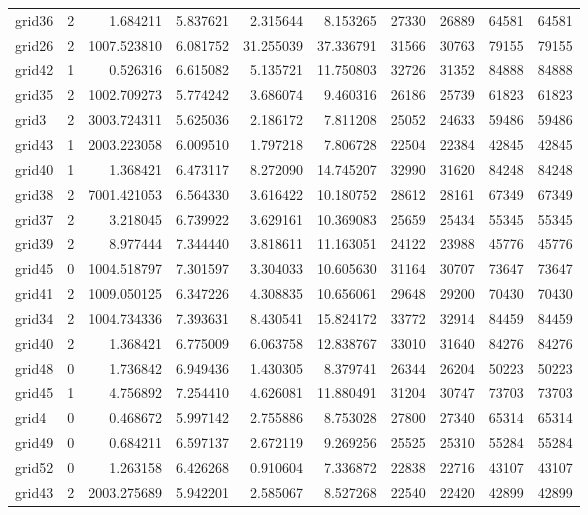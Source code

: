 \begin{longtable}{|l|r|r|r|r|r|r|r|r|r|}
grid36 & 2 & 1.684211 & 5.837621 & 2.315644 & 8.153265 & 27330 & 26889 & 64581 & 64581 \\
grid26 & 2 & 1007.523810 & 6.081752 & 31.255039 & 37.336791 & 31566 & 30763 & 79155 & 79155 \\
grid42 & 1 & 0.526316 & 6.615082 & 5.135721 & 11.750803 & 32726 & 31352 & 84888 & 84888 \\
grid35 & 2 & 1002.709273 & 5.774242 & 3.686074 & 9.460316 & 26186 & 25739 & 61823 & 61823 \\
grid3 & 2 & 3003.724311 & 5.625036 & 2.186172 & 7.811208 & 25052 & 24633 & 59486 & 59486 \\
grid43 & 1 & 2003.223058 & 6.009510 & 1.797218 & 7.806728 & 22504 & 22384 & 42845 & 42845 \\
grid40 & 1 & 1.368421 & 6.473117 & 8.272090 & 14.745207 & 32990 & 31620 & 84248 & 84248 \\
grid38 & 2 & 7001.421053 & 6.564330 & 3.616422 & 10.180752 & 28612 & 28161 & 67349 & 67349 \\
grid37 & 2 & 3.218045 & 6.739922 & 3.629161 & 10.369083 & 25659 & 25434 & 55345 & 55345 \\
grid39 & 2 & 8.977444 & 7.344440 & 3.818611 & 11.163051 & 24122 & 23988 & 45776 & 45776 \\
grid45 & 0 & 1004.518797 & 7.301597 & 3.304033 & 10.605630 & 31164 & 30707 & 73647 & 73647 \\
grid41 & 2 & 1009.050125 & 6.347226 & 4.308835 & 10.656061 & 29648 & 29200 & 70430 & 70430 \\
grid34 & 2 & 1004.734336 & 7.393631 & 8.430541 & 15.824172 & 33772 & 32914 & 84459 & 84459 \\
grid40 & 2 & 1.368421 & 6.775009 & 6.063758 & 12.838767 & 33010 & 31640 & 84276 & 84276 \\
grid48 & 0 & 1.736842 & 6.949436 & 1.430305 & 8.379741 & 26344 & 26204 & 50223 & 50223 \\
grid45 & 1 & 4.756892 & 7.254410 & 4.626081 & 11.880491 & 31204 & 30747 & 73703 & 73703 \\
grid4 & 0 & 0.468672 & 5.997142 & 2.755886 & 8.753028 & 27800 & 27340 & 65314 & 65314 \\
grid49 & 0 & 0.684211 & 6.597137 & 2.672119 & 9.269256 & 25525 & 25310 & 55284 & 55284 \\
grid52 & 0 & 1.263158 & 6.426268 & 0.910604 & 7.336872 & 22838 & 22716 & 43107 & 43107 \\
grid43 & 2 & 2003.275689 & 5.942201 & 2.585067 & 8.527268 & 22540 & 22420 & 42899 & 42899 \\

\end{longtable}
